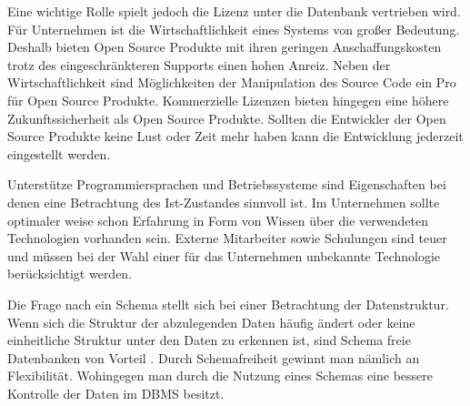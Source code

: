 Eine wichtige Rolle spielt jedoch die Lizenz unter die Datenbank vertrieben wird. Für Unternehmen ist die Wirtschaftlichkeit eines Systems von großer Bedeutung. Deshalb bieten Open Source Produkte mit ihren geringen Anschaffungskosten trotz des eingeschränkteren Supports einen hohen Anreiz. Neben der Wirtschaftlichkeit sind Möglichkeiten der Manipulation des Source Code ein Pro für Open Source Produkte. 
Kommerzielle Lizenzen bieten hingegen eine höhere Zukunftssicherheit als Open Source Produkte. Sollten die Entwickler der Open Source Produkte keine Lust oder Zeit mehr haben kann die Entwicklung jederzeit eingestellt werden. 

Unterstütze Programmiersprachen und Betriebssysteme sind Eigenschaften bei denen eine Betrachtung des Ist-Zustandes sinnvoll ist. Im Unternehmen sollte optimaler weise schon Erfahrung in Form von Wissen über die verwendeten Technologien vorhanden sein. Externe Mitarbeiter sowie Schulungen sind teuer und müssen bei der Wahl einer für das Unternehmen unbekannte Technologie berücksichtigt werden. 

Die Frage nach ein Schema stellt sich bei einer Betrachtung der Datenstruktur. Wenn sich die Struktur der abzulegenden Daten häufig ändert oder keine einheitliche Struktur unter den Daten zu erkennen ist, sind Schema freie Datenbanken von Vorteil . Durch Schemafreiheit gewinnt man nämlich an Flexibilität. Wohingegen man durch die Nutzung eines Schemas eine bessere Kontrolle der Daten im DBMS besitzt.  


